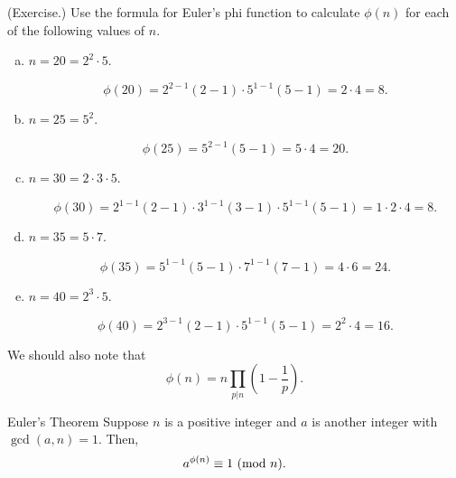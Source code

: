 \documentclass[letterpaper]{article}
\begin{document}
\begin{mdframed}
    (Exercise.) Use the formula for Euler's phi function to calculate $\phi(n)$ for each of the following values of $n$. 
    \begin{enumerate}[(a)]
        \item $n = 20 = 2^2 \cdot 5$. 
        \begin{mdframed}
            \[\phi(20) = 2^{2 - 1}(2 - 1) \cdot 5^{1 - 1}(5 - 1) = 2 \cdot 4 = 8.\]
        \end{mdframed}
        \item $n = 25 = 5^2$. 
        \begin{mdframed}
            \[\phi(25) = 5^{2 - 1}(5 - 1) = 5 \cdot 4 = 20.\]
        \end{mdframed}
        \item $n = 30 = 2 \cdot 3 \cdot 5$. 
        \begin{mdframed}
            \[\phi(30) = 2^{1 - 1}(2 - 1) \cdot 3^{1 - 1}(3 - 1) \cdot 5^{1 - 1}(5 - 1) = 1 \cdot 2 \cdot 4 = 8.\]
        \end{mdframed}
        \item $n = 35 = 5 \cdot 7$. 
        \begin{mdframed}
            \[\phi(35) = 5^{1 - 1}(5 - 1) \cdot 7^{1 - 1}(7 - 1) = 4 \cdot 6 = 24.\]
        \end{mdframed}
        \item $n = 40 = 2^3 \cdot 5$. 
        \begin{mdframed}
            \[\phi(40) = 2^{3 - 1}(2 - 1) \cdot 5^{1 - 1}(5 - 1) = 2^2 \cdot 4 = 16.\]
        \end{mdframed}
    \end{enumerate}
\end{mdframed}
We should also note that \[\phi(n) = n \prod_{p | n} \left(1 - \frac{1}{p}\right).\]

\begin{theorem}{Euler's Theorem}{}
    Suppose $n$ is a positive integer and $a$ is another integer with $\gcd(a, n) = 1$. Then, \[a^{\phi(n)} \equiv 1 \ (\mathrm{mod}\ n).\]
\end{theorem}
\end{document}
